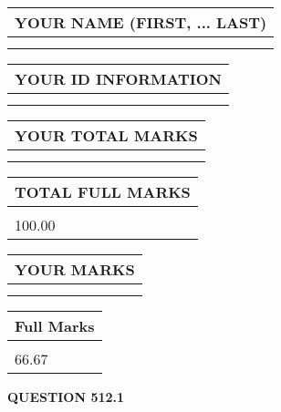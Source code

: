 \documentclass{ctexart}
\begin{document}
   
   
   
\newpage 
\setcounter{page}{ 
   512001 } 
   
   
   
   
\noindent\begin{tabular}{|l|}
\hline
YOUR NAME (FIRST, ... LAST)  \\
\hline
 \\ 
 \\ 
\hline
\end{tabular}
\hspace{0.05in} \begin{tabular}{|l|}
\hline
 YOUR   ID   INFORMATION  \\
\hline
 \\ 
 \\ 
\hline
\end{tabular}
   
   
\vspace{0.2in}\noindent\begin{tabular}{|l|}
\hline
YOUR TOTAL MARKS  \\
\hline
 \\ 
 \\ 
\hline
\end{tabular}
\hspace{0.05in} \begin{tabular}{|l|}
\hline
TOTAL FULL MARKS  \\
\hline
 \\ 
100.00 \\
\hline
\end{tabular}
   
   
 \vspace{0.2in}
 
 
 
 
   
   
  
\vspace{0.2in}
  
\noindent\begin{tabular}{|l|}
\hline
 YOUR MARKS  \\
\hline
 \\ 
 \\ 
\hline
\end{tabular}
\hspace{0.05in} \begin{tabular}{|l|}
\hline
 Full Marks  \\
\hline
 \\ 
66.67 \\
\hline
\end{tabular}
{\textbf{\Large{QUESTION
512.1 
}}}
  
\end{document}
